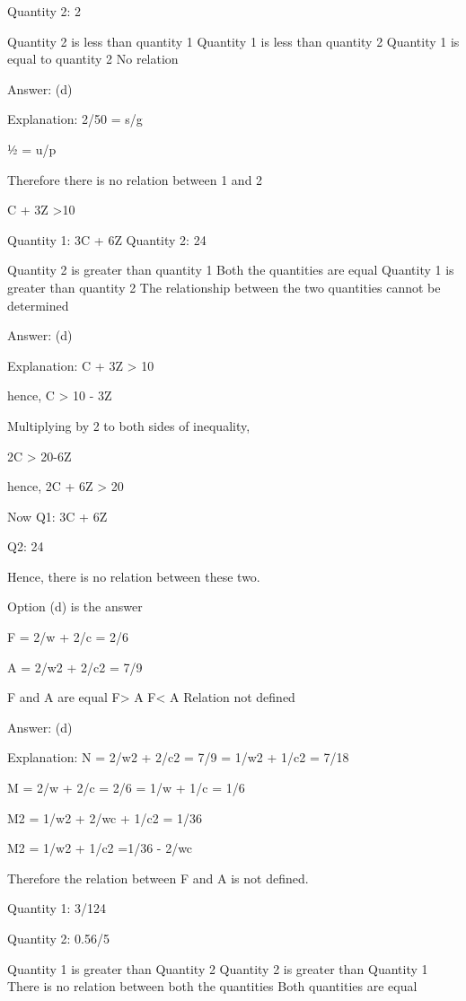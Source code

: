     Quantity 2: 2

        Quantity 2 is less than quantity 1
        Quantity 1 is less than quantity 2
        Quantity 1 is equal to quantity 2
        No relation

    Answer: (d)

    Explanation: 2/50 = s/g

    ½ = u/p

    Therefore there is no relation between 1 and 2

    C + 3Z >10

    Quantity 1: 3C + 6Z Quantity 2: 24

        Quantity 2 is greater than quantity 1
        Both the quantities are equal
        Quantity 1 is greater than quantity 2
        The relationship between the two quantities cannot be determined

    Answer: (d)

    Explanation:  C + 3Z > 10

    hence, C > 10 - 3Z

    Multiplying by 2 to both sides of inequality,

    2C > 20-6Z

    hence, 2C + 6Z > 20

    Now Q1: 3C + 6Z

    Q2: 24

    Hence, there is no relation between these two.

    Option (d) is the answer

    F = 2/w + 2/c = 2/6

    A = 2/w2 + 2/c2 = 7/9

        F and A are equal
        F> A
        F< A
        Relation not defined

    Answer: (d)

    Explanation: N = 2/w2 + 2/c2 = 7/9 = 1/w2 + 1/c2 = 7/18

    M = 2/w + 2/c = 2/6 = 1/w + 1/c = 1/6

    M2 = 1/w2 + 2/wc + 1/c2 = 1/36

    M2 = 1/w2 + 1/c2 =1/36 - 2/wc

    Therefore the relation between F and A is not defined.

    Quantity 1: 3/124

    Quantity 2: 0.56/5

        Quantity 1 is greater than Quantity 2
        Quantity 2 is greater than Quantity 1
        There is no relation between both the quantities
        Both quantities are equal


